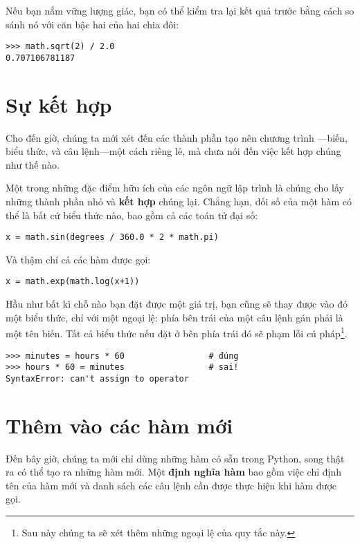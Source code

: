 \documentclass[11pt]{book}
\begin{document}
Nếu bạn nắm vững lượng giác, bạn có thể kiểm tra lại kết quả
trước bằng cách so sánh nó với căn bậc hai của hai chia đôi:


\beforeverb
\begin{verbatim}
>>> math.sqrt(2) / 2.0
0.707106781187
\end{verbatim}
\afterverb
%

\section{Sự kết hợp}

Cho đến giờ, chúng ta mới xét đến các thành phần tạo nên chương trình
---biến, biểu thức, và câu lệnh---một cách riêng lẻ, mà chưa nói đến
việc kết hợp chúng như thế nào.

Một trong những đặc điểm hữu ích của các ngôn ngữ lập trình là chúng
cho lấy những thành phần nhỏ và {\bf kết hợp} chúng lại. Chẳng hạn,
đối số của một hàm có thể là bất cứ biểu thức nào, bao gồm cả các 
toán tử đại số:

\beforeverb
\begin{verbatim}
x = math.sin(degrees / 360.0 * 2 * math.pi)
\end{verbatim}
\afterverb
%
Và thậm chí cả các hàm được gọi:

\beforeverb
\begin{verbatim}
x = math.exp(math.log(x+1))
\end{verbatim}
\afterverb
%
Hầu như bất kì chỗ nào bạn đặt được một giá trị, bạn cũng sẽ thay
được vào đó một biểu thức, chỉ với một ngoại lệ: phía bên trái của
một câu lệnh gán phải là một tên biến. Tất cả biểu thức nếu đặt ở
bên phía trái đó sẽ phạm lỗi cú pháp\footnote{Sau này chúng ta
sẽ xét thêm những ngoại lệ của quy tắc này.}.

\beforeverb
\begin{verbatim}
>>> minutes = hours * 60                 # đúng
>>> hours * 60 = minutes                 # sai!
SyntaxError: can't assign to operator
\end{verbatim}
\afterverb
%


\section{Thêm vào các hàm mới}

Đến bây giờ, chúng ta mới chỉ dùng những hàm có sẵn trong Python,
song thật ra có thể tạo ra những hàm mới.
Một {\bf định nghĩa hàm} bao gồm việc chỉ định tên của hàm mới và
danh sách các câu lệnh cần được thực hiện khi hàm được gọi.
\end{document}

